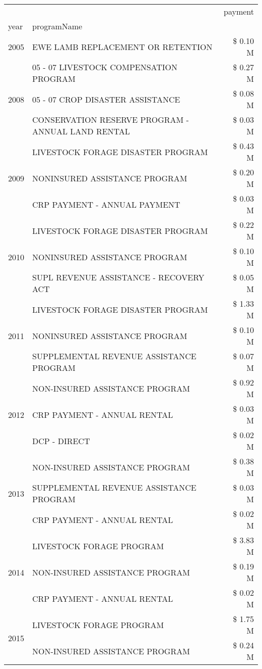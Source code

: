 \begin{tabular}{llr}
\toprule
 &  & payment \\
year & programName &  \\
\midrule
2005 & EWE LAMB REPLACEMENT OR RETENTION & \$ 0.10 M \\
\cline{1-3}
\multirow[t]{3}{*}{2008} & 05 - 07 LIVESTOCK COMPENSATION PROGRAM & \$ 0.27 M \\
 & 05 - 07 CROP DISASTER ASSISTANCE & \$ 0.08 M \\
 & CONSERVATION RESERVE PROGRAM - ANNUAL LAND RENTAL & \$ 0.03 M \\
\cline{1-3}
\multirow[t]{3}{*}{2009} & LIVESTOCK FORAGE DISASTER  PROGRAM & \$ 0.43 M \\
 & NONINSURED ASSISTANCE PROGRAM & \$ 0.20 M \\
 & CRP PAYMENT - ANNUAL PAYMENT & \$ 0.03 M \\
\cline{1-3}
\multirow[t]{3}{*}{2010} & LIVESTOCK FORAGE DISASTER PROGRAM & \$ 0.22 M \\
 & NONINSURED ASSISTANCE PROGRAM & \$ 0.10 M \\
 & SUPL REVENUE ASSISTANCE - RECOVERY ACT & \$ 0.05 M \\
\cline{1-3}
\multirow[t]{3}{*}{2011} & LIVESTOCK FORAGE DISASTER PROGRAM & \$ 1.33 M \\
 & NONINSURED ASSISTANCE PROGRAM & \$ 0.10 M \\
 & SUPPLEMENTAL REVENUE ASSISTANCE PROGRAM & \$ 0.07 M \\
\cline{1-3}
\multirow[t]{3}{*}{2012} & NON-INSURED ASSISTANCE PROGRAM & \$ 0.92 M \\
 & CRP PAYMENT - ANNUAL RENTAL & \$ 0.03 M \\
 & DCP - DIRECT & \$ 0.02 M \\
\cline{1-3}
\multirow[t]{3}{*}{2013} & NON-INSURED ASSISTANCE PROGRAM & \$ 0.38 M \\
 & SUPPLEMENTAL REVENUE ASSISTANCE PROGRAM & \$ 0.03 M \\
 & CRP PAYMENT - ANNUAL RENTAL & \$ 0.02 M \\
\cline{1-3}
\multirow[t]{3}{*}{2014} & LIVESTOCK FORAGE PROGRAM & \$ 3.83 M \\
 & NON-INSURED ASSISTANCE PROGRAM & \$ 0.19 M \\
 & CRP PAYMENT - ANNUAL RENTAL & \$ 0.02 M \\
\cline{1-3}
\multirow[t]{3}{*}{2015} & LIVESTOCK FORAGE PROGRAM & \$ 1.75 M \\
 & NON-INSURED ASSISTANCE PROGRAM & \$ 0.24 M \\

\end{tabular}
